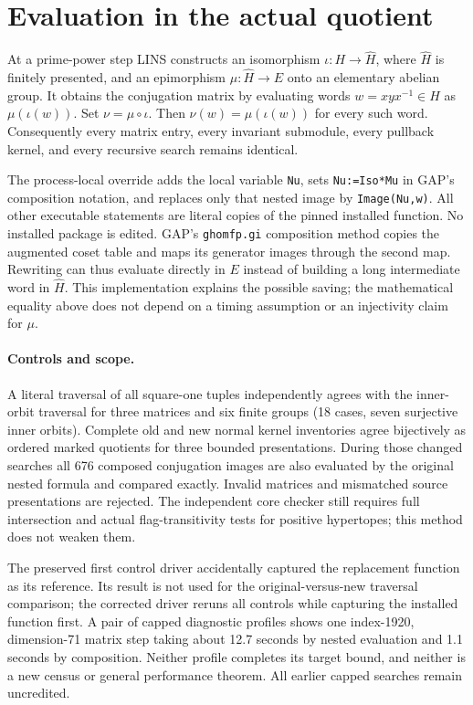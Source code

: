 \documentclass[11pt]{article}
\begin{document}
\section{Evaluation in the actual quotient}
At a prime-power step LINS constructs an isomorphism
$\iota:H\to\widehat H$, where $\widehat H$ is finitely presented, and an
epimorphism $\mu:\widehat H\to E$ onto an elementary abelian group.
It obtains the conjugation matrix by evaluating words
$w=xyx^{-1}\in H$ as $\mu(\iota(w))$.
Set $\nu=\mu\circ\iota$. Then $\nu(w)=\mu(\iota(w))$ for every such
word. Consequently every matrix entry, every invariant submodule, every
pullback kernel, and every recursive search remains identical.

The process-local override adds the local variable \texttt{Nu}, sets
\texttt{Nu:=Iso*Mu} in GAP's composition notation, and replaces
only that nested image by \texttt{Image(Nu,w)}. All other executable
statements are literal copies of the pinned installed function. No
installed package is edited. GAP's \texttt{ghomfp.gi} composition method
copies the augmented coset table and maps its generator images through
the second map. Rewriting can thus evaluate directly in $E$ instead of
building a long intermediate word in $\widehat H$. This implementation
explains the possible saving; the mathematical equality above does not
depend on a timing assumption or an injectivity claim for $\mu$.

\paragraph{Controls and scope.}
A literal traversal of all square-one tuples independently agrees with
the inner-orbit traversal for three matrices and six finite groups
(18 cases, seven surjective inner orbits). Complete old and new normal
kernel inventories agree bijectively as ordered marked quotients for
three bounded presentations. During those changed searches all 676
composed conjugation images are also evaluated by the original nested
formula and compared exactly. Invalid matrices and mismatched source
presentations are rejected. The independent core checker still requires
full intersection and actual flag-transitivity tests for positive
hypertopes; this method does not weaken them.

The preserved first control driver accidentally captured the replacement
function as its reference. Its result is not used for the original-versus-new
traversal comparison; the corrected driver reruns all controls while
capturing the installed function first. A pair of capped diagnostic
profiles shows one index-1920, dimension-71 matrix step taking about
12.7 seconds by nested evaluation and 1.1 seconds by composition.
Neither profile completes its target bound, and neither is a new census
or general performance theorem. All earlier capped searches remain
uncredited.
\end{document}
